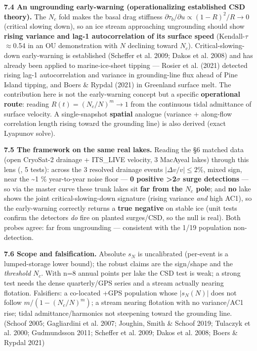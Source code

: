 \documentclass[11pt]{article}
\begin{document}
\textbf{7.4 An ungrounding early-warning (operationalizing established CSD theory).} The $N_{c}$ fold makes the basal drag stiffness $\partial \tau _{b}/\partial u\propto (1-R)^{2}/R\to 0$ (critical slowing down), so an ice stream approaching ungrounding should show \textbf{rising variance and lag-1 autocorrelation of its surface speed} (Kendall-\ensuremath{\tau}\ensuremath{\approx}0.54 in an OU demonstration with $N$ declining toward $N_{c}$). Critical-slowing-down early-warning is established (Scheffer et al. 2009; Dakos et al. 2008) and has already been applied to marine-ice-sheet tipping — Rosier et al. (2021) detected rising lag-1 autocorrelation and variance in grounding-line flux ahead of Pine Island tipping, and Boers \& Rypdal (2021) in Greenland surface melt. The contribution here is not the early-warning concept but a specific \textbf{operational route}: reading $R(t)=(N_{c}/N)^{m}\to 1$ from the continuous tidal admittance of surface velocity. A single-snapshot \textbf{spatial} analogue (variance + along-flow correlation length rising toward the grounding line) is also derived (exact Lyapunov solve).


\textbf{7.5 The framework on the same real lakes.} Reading the §6 matched data (open CryoSat-2 drainage + ITS\_LIVE velocity, 3 MacAyeal lakes) through this lens (, 5 tests): across the 3 resolved drainage events $|\Delta v/v|\le 2 \%$, mixed sign, near the \textasciitilde{}1 \% year-to-year noise floor — \textbf{0 positive >2\ensuremath{\sigma} surge detections} — so via the master curve these trunk lakes sit \textbf{far from the $N_{c}$ pole}; and \textbf{no} lake shows the joint critical-slowing-down signature (rising variance \emph{and} high AC1), so the early-warning correctly returns a \textbf{true negative} on stable ice (unit tests confirm the detectors \emph{do} fire on planted surges/CSD, so the null is real). Both probes agree: far from ungrounding — consistent with the 1/19 population non-detection.


\textbf{7.6 Scope and falsification.} Absolute $s_{N}$ is uncalibrated (per-event  is a lumped-storage lower bound); the robust claims are the sign/shape and the \emph{threshold} $N_{c}$. With n=8 annual points per lake the CSD test is weak; a strong test needs the dense quarterly/GPS series and a stream actually nearing flotation. Falsifiers: a co-located +GPS population whose $|s_{N}(N)|$ does not follow $m/(1-(N_{c}/N)^{m})$; a stream nearing flotation with no variance/AC1 rise; tidal admittance/harmonics not steepening toward the grounding line. (Schoof 2005; Gagliardini et al. 2007; Joughin, Smith \& Schoof 2019; Tulaczyk et al. 2000; Gudmundsson 2011; Scheffer et al. 2009; Dakos et al. 2008; Boers \& Rypdal 2021)
\end{document}
